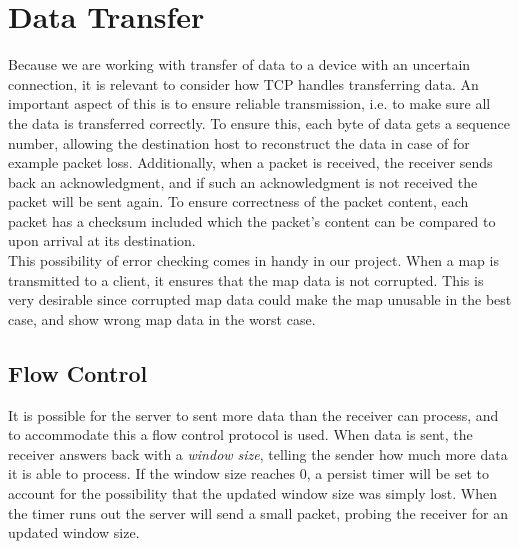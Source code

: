 \section{Data Transfer}
Because we are working with transfer of data to a device with an uncertain connection, it is relevant to consider how TCP handles transferring data. An important aspect of this is to ensure reliable transmission, i.e. to make sure all the data is transferred correctly. To ensure this, each byte of data gets a sequence number, allowing the destination host to reconstruct the data in case of for example packet loss. Additionally, when a packet is received, the receiver sends back an acknowledgment, and if such an acknowledgment is not received the packet will be sent again. To ensure correctness of the packet content, each packet has a checksum included which the packet's content can be compared to upon arrival at its destination.\\

This possibility of error checking comes in handy in our project. When a map is transmitted to a client, it ensures that the map data is not corrupted. This is very desirable since corrupted map data could make the map unusable in the best case, and show wrong map data in the worst case.

\subsection{Flow Control}
It is possible for the server to sent more data than the receiver can process, and to accommodate this a flow control protocol is used. When data is sent, the receiver answers back with a \textit{window size}, telling the sender how much more data it is able to process. If the window size reaches 0, a persist timer will be set to account for the possibility that the updated window size was simply lost. When the timer runs out the server will send a small packet, probing the receiver for an updated window size.


